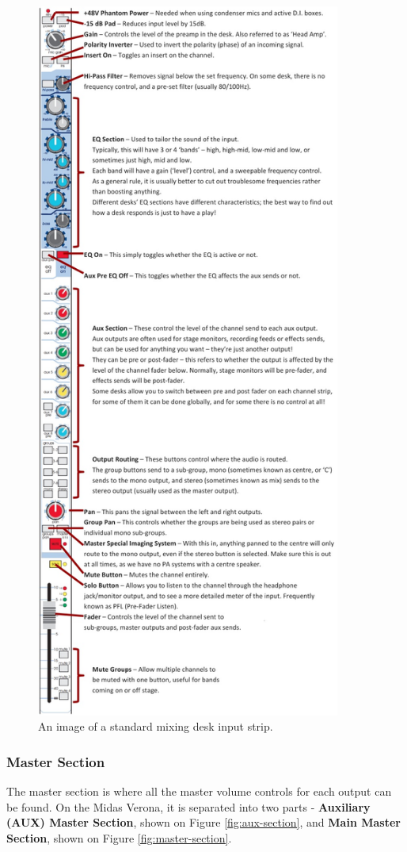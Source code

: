 \documentclass[14pt]{article} %
\begin{document}
\begin{figure}[H]
\begin{center}

\includegraphics[width=10cm]{channel-strip.jpg}
\caption{An image of a standard mixing desk input strip.}
\label{fig:channel-strip}

\end{center}
\end{figure}

\subsubsection{Master Section}
\label{master-section}
The master section is where all the master volume controls for each output can be found. On the Midas Verona, it is separated into two parts - \textbf{Auxiliary (AUX) Master Section}, shown on Figure \ref{fig:aux-section}, and \textbf{Main Master Section}, shown on Figure \ref{fig:master-section}.
\end{document}
